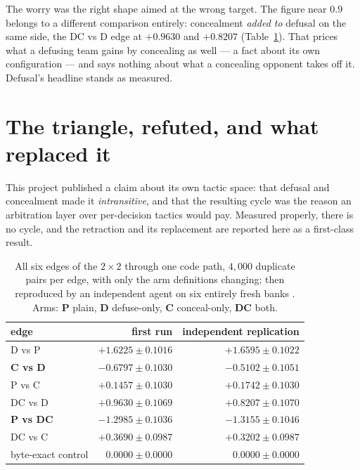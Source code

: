 \documentclass[11pt]{article}
\begin{document}
The worry was the right shape aimed at the wrong target. The figure near $0.9$ belongs to a
different comparison entirely: concealment \emph{added to} defusal on the same side, the DC vs D
edge at $+0.9630$ and $+0.8207$ (Table~\ref{tab:triangle}). That prices what a defusing team gains
by concealing as well --- a fact about its own configuration --- and says nothing about what a
concealing opponent takes off it. Defusal's headline stands as measured.

\section{The triangle, refuted, and what replaced it}
\label{sec:triangle}

This project published a claim about its own tactic space: that defusal and concealment made it
\emph{intransitive}, and that the resulting cycle was the reason an arbitration layer over
per-decision tactics would pay. Measured properly, there is no cycle, and the retraction and its
replacement are reported here as a first-class result.

\begin{table}[t]
\centering
\caption{All six edges of the $2\times2$ through one code path, $4{,}000$ duplicate pairs
per edge, with only the arm definitions changing; then reproduced by an independent agent on six
entirely fresh banks \cite{concession}. Arms: \textbf{P} plain, \textbf{D} defuse-only, \textbf{C}
conceal-only, \textbf{DC} both.}
\label{tab:triangle}
\footnotesize
\begin{tabular}{@{}lrr@{}}
\toprule
edge & first run & independent replication \\
\midrule
D vs P   & $+1.6225 \pm 0.1016$ & $+1.6595 \pm 0.1022$ \\
\textbf{C vs D} & $\mathbf{-0.6797 \pm 0.1030}$ & $\mathbf{-0.5102 \pm 0.1051}$ \\
P vs C   & $+0.1457 \pm 0.1030$ & $+0.1742 \pm 0.1030$ \\
DC vs D  & $+0.9630 \pm 0.1069$ & $+0.8207 \pm 0.1070$ \\
\textbf{P vs DC} & $\mathbf{-1.2985 \pm 0.1036}$ & $\mathbf{-1.3155 \pm 0.1046}$ \\
DC vs C  & $+0.3690 \pm 0.0987$ & $+0.3202 \pm 0.0987$ \\
byte-exact control & $0.0000 \pm 0.0000$ & $0.0000 \pm 0.0000$ \\
\bottomrule
\end{tabular}
\end{table}
\end{document}
